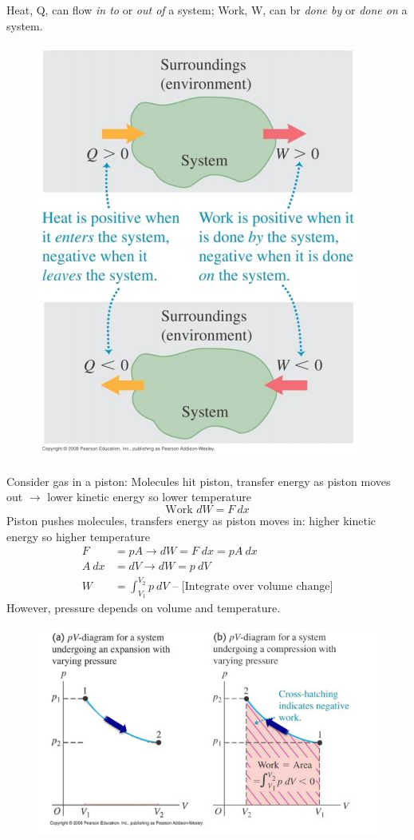 \documentclass[a4paper, 11pt, normalem]{report}
\begin{document}
Heat, Q, can flow \emph{in to} or \emph{out of} a system; Work, W, can br \emph{done by} or \emph{done on} a system.
\begin{figure}[H]
    \centering
    \includegraphics{ThermoSystem.jpg}
\end{figure}
Consider gas in a piston:
Molecules hit piston, transfer energy as piston moves out $\rightarrow$ lower kinetic energy so lower temperature
\begin{equation}
	\text{Work } dW = F\:dx
\end{equation}
Piston pushes molecules, transfers energy as piston moves in: higher kinetic energy so higher temperature
\begin{align}
    F &= pA \rightarrow dW = F\;dx = pA\:dx \\
    A\:dx &= dV \rightarrow dW = p\:dV \\
    W &= \int_{V_{1}}^{V_{2}} p\:dV \text{ -- [Integrate over volume change]}
\end{align}
However, pressure depends on volume and temperature.
\begin{figure}[H]
    \centering
    \includegraphics[scale=0.8]{pV.jpg}
\end{figure}
\end{document}
